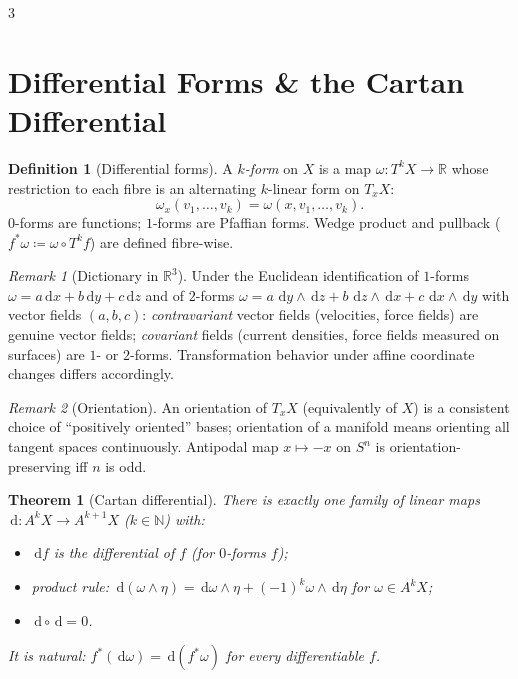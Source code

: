 \documentclass[10pt,a4paper,landscape]{article}
\theoremstyle{definition}
\newtheorem{defn}{Definition}[section]
\theoremstyle{plain}
\newtheorem{thm}{Theorem}[section]
\theoremstyle{remark}
\newtheorem{rem}{Remark}[section]
\newcommand{\R}{\mathbb{R}}
\newcommand{\N}{\mathbb{N}}
\newcommand{\dd}{\,\mathrm{d}}
\newcommand{\deq}{\coloneqq}
\newcommand{\comp}{\circ}
\begin{document}
\begin{multicols*}{3}
\section{Differential Forms \& the Cartan Differential}

\begin{defn}[Differential forms]
A \emph{$k$-form} on $X$ is a map $\omega: T^kX \to \R$ whose restriction to each fibre is an alternating $k$-linear form on $T_xX$:
\[
\omega_x(v_1, \dots, v_k) = \omega(x, v_1, \dots, v_k).
\]
$0$-forms are functions; $1$-forms are Pfaffian forms. Wedge product and pullback ($f^*\omega \deq \omega \comp T^k f$) are defined fibre-wise.
\end{defn}

\begin{rem}[Dictionary in $\R^3$]
Under the Euclidean identification of $1$-forms $\omega = a\dd x + b\dd y + c\dd z$ and of $2$-forms $\omega = a\,\dd y \wedge \dd z + b\,\dd z \wedge \dd x + c\,\dd x \wedge \dd y$ with vector fields $(a,b,c)$: \emph{contravariant} vector fields (velocities, force fields) are genuine vector fields; \emph{covariant} fields (current densities, force fields measured on surfaces) are $1$- or $2$-forms. Transformation behavior under affine coordinate changes differs accordingly.
\end{rem}

\begin{rem}[Orientation]
An orientation of $T_xX$ (equivalently of $X$) is a consistent choice of ``positively oriented'' bases; orientation of a manifold means orienting all tangent spaces continuously. Antipodal map $x \mapsto -x$ on $S^n$ is orientation-preserving iff $n$ is odd.
\end{rem}

\begin{thm}[Cartan differential]
There is exactly one family of linear maps $\dd: A^kX \to A^{k+1}X$ ($k \in \N$) with:
\begin{itemize}
\item $\dd f$ is the differential of $f$ (for $0$-forms $f$);
\item product rule: $\dd(\omega \wedge \eta) = \dd\omega \wedge \eta + (-1)^k \omega \wedge \dd\eta$ for $\omega \in A^kX$;
\item $\dd \comp \dd = 0$.
\end{itemize}
It is natural: $f^*(\dd\omega) = \dd(f^*\omega)$ for every differentiable $f$.
\end{thm}


\end{multicols*}
\end{document}

